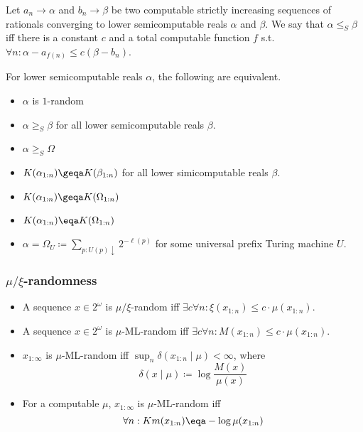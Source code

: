 \documentclass[UTF8,11pt,colorlinks,compress,openany]{beamer}%
\begin{document}
\begin{frame}\frametitle{}
\begin{definition}
Let $a_n\to\alpha$ and $b_n\to\beta$ be two computable strictly increasing sequences of rationals converging to lower semicomputable reals $\alpha$ and $\beta$. We say that $\alpha\leq_S\beta$ iff there is a constant $c$ and a total computable function $f$ s.t. $\forall n:\alpha-a_{f(n)}\leq c(\beta-b_n)$.
\end{definition}
\begin{theorem}
For lower semicomputable reals $\alpha$, the following are equivalent.
\begin{itemize}
	\item $\alpha$ is $1$-random
	\item $\alpha\geq_S\beta$ for all lower semicomputable reals $\beta$.
	\item $\alpha\geq_S\Omega$
	\item $K(\alpha_{1:n})\geqa K(\beta_{1:n})$ for all lower simicomputable reals $\beta$.
	\item $K(\alpha_{1:n})\geqa K(\Omega_{1:n})$
	\item $K(\alpha_{1:n})\eqa K(\Omega_{1:n})$
	\item $\alpha=\Omega_U\coloneqq \sum\limits_{p:U(p)\downarrow}2^{-\ell(p)}$ for some universal prefix Turing machine $U$.
\end{itemize}
\end{theorem}
\end{frame}

\begin{frame}\frametitle{$\mu/\xi$-randomness}
\begin{definition}[$\mu/\xi$-randomness]
\begin{itemize}
	\item A sequence $x\in 2^\omega$ is $\mu/\xi$-random iff $\exists c\forall n: \xi(x_{1:n})\leq c\cdot\mu(x_{1:n})$.
	\item A sequence $x\in 2^\omega$ is $\mu$-ML-random iff $\exists c\forall n: M(x_{1:n})\leq c\cdot\mu(x_{1:n})$.
\end{itemize}
\end{definition}
\begin{block}{}
\begin{itemize}
\item $x_{1:\infty}$ is $\mu$-ML-random iff $\sup_n\delta(x_{1:n}\mid\mu)<\infty$, where
\[\delta(x\mid\mu)\coloneqq \log\frac{M(x)}{\mu(x)}\]
\item For a computable $\mu$, $x_{1:\infty}$ is $\mu$-ML-random iff
\[\forall n: Km(x_{1:n})\eqa-\log\mu(x_{1:n})\]
\end{itemize}	
\end{block}
\end{frame}
\end{document}

